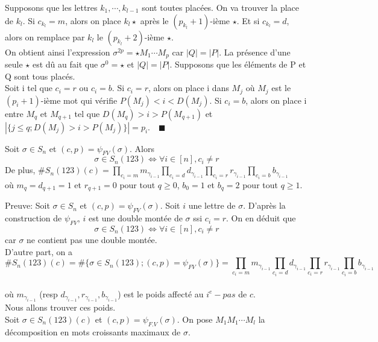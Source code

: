 Supposons que les lettres $k_{1},\cdots, k_{l-1} $ sont toutes placées. On va trouver la place de $k_{l}$.
Si $c_{k_{l}} = m$, alors on place $k_{l}\star$ après le $(p_{k_{l}}+1)$-ième $\star$. Et si $c_{k_{l}}=d$, alors on
remplace par $k_{l}$ le $(p_{k_{l}}+2)$-ième $\star$.\\
On obtient ainsi l'expression $\sigma^{2p} = \star M_{1}\cdots M_{p} $ car $|Q| = |P|$. La présence d'une seule $\star$
est dû au fait que $\sigma^0 = \star$ et $|Q| = |P|$. Supposons que les éléments de P et Q sont tous placés.\\ Soit i
tel que $c_{i}=r \text{ ou } c_{i}=b$. Si $c_{i}=r$, alors on place i dans $M_{j}$ où $M_{j}$ est le $(p_{i}+1)$-ième
mot qui vérifie $P(M_{j}) < i < D(M_{j})$.
Si $c_{i}=b$, alors on place i entre $M_{q}$ et $M_{q+1}$ tel que $D(M_{q})>i>P(M_{q+1}) $ et $|\{j\leq q;
	D(M_{j})>i>P(M_{j})\}| = p_{i} $. $\text{ } \blacksquare$\\
\begin{lemme}\label{noRedPath123}
	Soit $\sigma \in S_{n}$ et $(c, p) = \psi_{FV}(\sigma)$. Alors $$ \sigma \in S_{n}(123) \iff \forall i \in [n], c_{i}\neq r$$
	De plus, $\#S_{n}(123)(c) = \prod\limits_{c_{i}=m}m_{\gamma_{i-1}} \prod\limits_{c_{i}=d}d_{\gamma_{i-1}} \prod\limits_{c_{i}=r}r_{\gamma_{i-1}} \prod\limits_{c_{i}=b}b_{\gamma_{i-1}}$\\
	où $m_{q}=d_{q+1}=1$ et $r_{q+1}=0$ pour tout $q\geq 0$, $b_{0}=1$ et $b_{q}=2$ pour tout $q\geq 1$.
\end{lemme}
Preuve: Soit $\sigma \in S_{n}$ et $(c,p) = \psi_{FV}(\sigma)$. Soit $i$ une lettre de $\sigma$. D'après la construction de $\psi_{FV}$, $i$ est une double montée de $\sigma$ ssi $c_{i}=r$. On en déduit que $$\sigma \in S_{n}(123) \iff \forall i \in [n], c_{i}\neq r$$ car $\sigma$ ne contient pas une double montée.\vspace{10pt}\\
D'autre part, on a $$\#S_{n}(123)(c) = \#\{\sigma \in S_{n}(123); (c, p)=\psi_{FV}(\sigma)\}= \prod\limits_{c_{i}=m}m_{\gamma_{i-1}} \prod\limits_{c_{i}=d}d_{\gamma_{i-1}} \prod\limits_{c_{i}=r}r_{\gamma_{i-1}} \prod\limits_{c_{i}=b}b_{\gamma_{i-1}}$$\\
où $m_{\gamma_{i-1}}$ (resp $d_{\gamma_{i-1}}, r_{\gamma_{i-1}}, b_{\gamma_{i-1}}$) est le poids affecté au $i^{e}-pas $ de $c$.\vspace{5pt}\\
Nous allons trouver ces poids.\\
Soit $\sigma \in S_{n}(123)(c)$ et $(c, p)=\psi_{F.V}(\sigma)$. On pose $M_{1}M_{1} \cdots M_{l}$ la décomposition en mots croissants maximaux de $\sigma$.\vspace{5pt}\\
